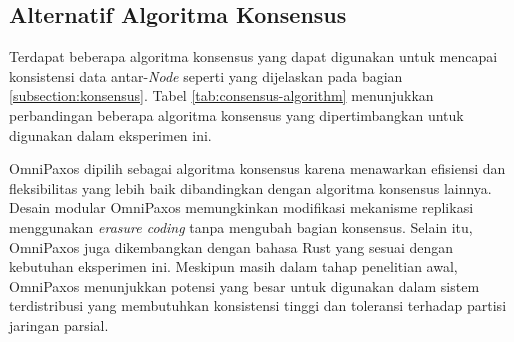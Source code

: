 \subsection{Alternatif Algoritma Konsensus}
\label{subsection:alternatif-algoritma-konsensus}

Terdapat beberapa algoritma konsensus yang dapat digunakan untuk mencapai konsistensi data antar-\textit{Node} seperti yang dijelaskan pada bagian \ref{subsection:konsensus}. Tabel \ref{tab:consensus-algorithm} menunjukkan perbandingan beberapa algoritma konsensus yang dipertimbangkan untuk digunakan dalam eksperimen ini.

\begin{table}[ht]
    \centering
    \caption{Perbandingan Algoritma Konsensus}
    \label{tab:consensus-algorithm}
\end{table}

OmniPaxos dipilih sebagai algoritma konsensus karena menawarkan efisiensi dan fleksibilitas yang lebih baik dibandingkan dengan algoritma konsensus lainnya. Desain modular OmniPaxos memungkinkan modifikasi mekanisme replikasi menggunakan \textit{erasure coding} tanpa mengubah bagian konsensus. Selain itu, OmniPaxos juga dikembangkan dengan bahasa Rust yang sesuai dengan kebutuhan eksperimen ini. Meskipun masih dalam tahap penelitian awal, OmniPaxos menunjukkan potensi yang besar untuk digunakan dalam sistem terdistribusi yang membutuhkan konsistensi tinggi dan toleransi terhadap partisi jaringan parsial.